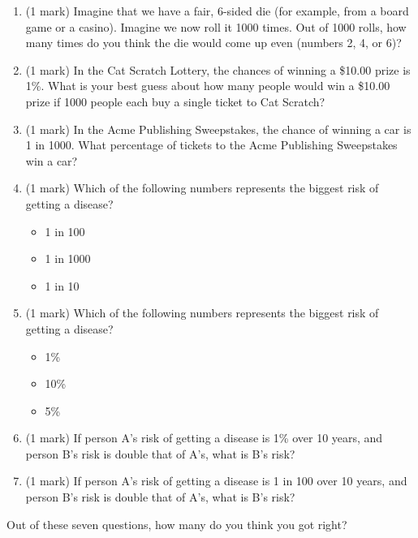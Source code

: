 \documentclass[12pt]{amsart}
\begin{document}
\begin{enumerate}

\item (1 mark) Imagine that we have a fair, 6-sided die (for example, from a board game or a casino).
Imagine we now roll it 1000 times.
Out of 1000 rolls, how many times do you think the die would come up even (numbers 2, 4, or 6)?

\vspace{2cm}

\item (1 mark) In the Cat Scratch Lottery, the chances of winning a \$10.00 prize is 1\%.
What is your best guess about how many people would win a \$10.00 prize if 1000 people each buy a single ticket to Cat Scratch?

\vspace{2cm}

\item (1 mark) In the Acme Publishing Sweepstakes, the chance of winning a car is 1 in 1000.
What percentage of tickets to the Acme Publishing Sweepstakes win a car?

\vspace{2cm}

\item (1 mark) Which of the following numbers represents the biggest risk of getting a disease?

\begin{itemize}
	\item 1 in 100
	\item 1 in 1000
	\item 1 in 10
\end{itemize}

\vspace{2cm}

\item (1 mark) Which of the following numbers represents the biggest risk of getting a disease?
\begin{itemize}
	\item 1\%
	\item 10\%
	\item 5\%
\end{itemize}

\vspace{2cm}

\item (1 mark) If person A's risk of getting a disease is 1\% over 10 years, and person B's risk is double that of A's, what is B's risk?

\vspace{2cm}

\item (1 mark) If person A's risk of getting a disease is 1 in 100 over 10 years, and person B's risk is double that of A's, what is B's risk?

\end{enumerate}

\vspace{2cm}

Out of these seven questions, how many do you think you got right?
\end{document}

